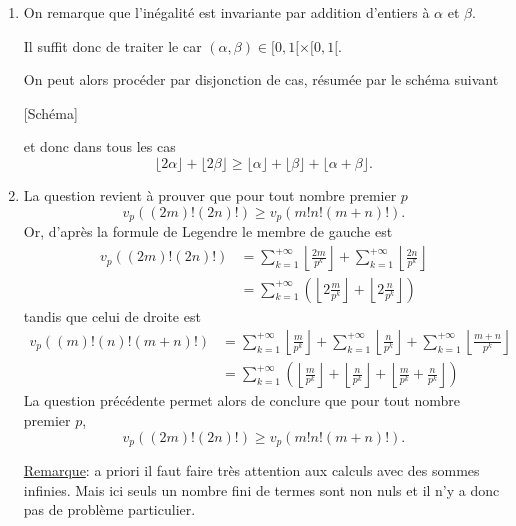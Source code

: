 \begin{sol}
    \begin{enumerate}
        \item On remarque que l'inégalité est invariante par addition d'entiers à $\alpha$ et $\beta$.

              Il suffit donc de traiter le car $(\alpha,\beta) \in [0,1[ \times [0,1[$.

              On peut alors procéder par disjonction de cas, résumée par le schéma suivant

                  [Schéma]

              et donc dans tous les cas
              \[\boxed{\lfloor 2 \alpha \rfloor  + \lfloor  2\beta\rfloor \geq \lfloor \alpha \rfloor + \lfloor \beta \rfloor + \lfloor \alpha + \beta \rfloor}. \]
        \item La question revient à prouver que pour tout nombre premier $p$
              \[v_p \left((2m)! (2n)! \right) \geq v_p\left( m! n! (m+n)!\right).\]
              Or, d'après la formule de Legendre le membre de gauche est
              \[\begin{aligned}
                      v_p \left((2m)! (2n)! \right) & = \sum_{k=1}^{+ \infty} \left\lfloor \frac{2m}{p^k} \right\rfloor + \sum_{k=1}^{+ \infty} \left\lfloor \frac{2n}{p^k} \right\rfloor\\
                      & = \sum_{k=1}^{+\infty} \left(\left\lfloor 2 \frac{m}{p^k} \right\rfloor + \left\lfloor 2 \frac{n}{p^k} \right\rfloor\right)
                  \end{aligned}\]
            tandis que celui de droite est
            \[\begin{aligned}
                v_p \left((m)! (n)!(m+n)! \right) & = \sum_{k=1}^{+ \infty} \left\lfloor \frac{m}{p^k} \right\rfloor + \sum_{k=1}^{+ \infty} \left\lfloor \frac{n}{p^k} \right\rfloor+ \sum_{k=1}^{+ \infty} \left\lfloor \frac{m+n}{p^k} \right\rfloor\\
                & = \sum_{k=1}^{+\infty} \left(\left\lfloor  \frac{m}{p^k} \right\rfloor + \left\lfloor \frac{n}{p^k} \right\rfloor+ \left\lfloor \frac{m}{p^k} +\frac{n}{p^k} \right\rfloor\right)
            \end{aligned}\]
            La question précédente permet alors de conclure que pour tout nombre premier $p$,
            \[\boxed{v_p \left((2m)! (2n)! \right) \geq v_p\left( m! n! (m+n)!\right)}.\]

            \underline{Remarque}: a priori il faut faire très attention aux calculs avec des sommes infinies. Mais ici seuls {un nombre fini de termes sont non nuls} et il n'y a donc pas de problème particulier.
    \end{enumerate}
\end{sol}

